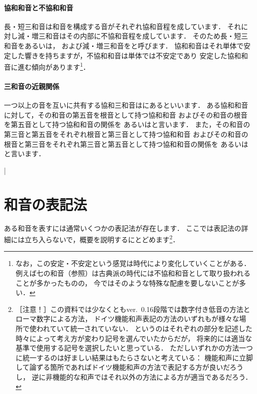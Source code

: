 \documentclass[dvipdfmx,uplatex,b5paper,openany,jbase=12Q,nomag*,textwidth-limit=44%
               ]{gachimuchi}
\begin{document}
\paragraph{協和和音と不協和和音}
長・短三和音は和音を構成する音がそれぞれ協和音程を成しています．
それに対し減・増三和音はその内部に不協和音程を成しています．
そのため長・短三和音をあるいは，
および減・増三和音をと呼びます．
協和和音はそれ単体で安定した響きを持ちますが，不協和和音は単体では不安定であり
安定した協和和音に進む傾向があります\footnote{%
  なお，この安定・不安定という感覚は時代により変化していくことがある．
  例えば七の和音（参照）は古典派の時代には不協和和音として取り扱われることが多かったものの，
  今ではそのような特殊な配慮を要しないことが多い．
}．
\paragraph{三和音の近親関係}
一つ以上の音を互いに共有する協和三和音はにあるといいます．
ある協和和音に対して，その和音の第五音を根音として持つ協和和音
およびその和音の根音を第五音として持つ協和和音の関係を
あるいはと言います．
また，その和音の第三音と第五音をそれぞれ根音と第三音として持つ協和和音
およびその和音の根音と第三音をそれぞれ第三音と第五音として持つ協和和音の関係を
あるいはと言います．
\begin{Music}[0.6\linewidth]
  \nostartrule%
  \Startpiece%
  \Notes%
  \en\bar%
  \Notes%
  \en%
  \endpiece%
\end{Music}

\section{和音の表記法}
ある和音を表すには通常いくつかの表記法が存在します．
ここでは表記法の詳細には立ち入らないで，概要を説明するにとどめます\footnote{
  ［注意！］この資料では少なくともver.~0.16段階では数字付き低音の方法とローマ数字による方法，
  ドイツ機能和声表記の方法のいずれもが様々な場所で使われていて統一されていない．
  というのはそれぞれの部分を記述した時々によって考え方が変わり記号を選んでいたからだが，
  将来的には適当な基準で使用する記号を選択したいと思っている．
  ただしいずれかの方法一つに統一するのは好ましい結果はもたらさないと考えている：
  機能和声に立脚して論ずる箇所であればドイツ機能和声の方法で表記する方が良いだろうし，
  逆に非機能的な和声ではそれ以外の方法による方が適当であるだろう．
}．
\end{document}
